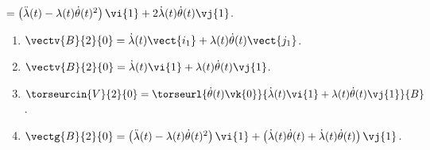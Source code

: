 $ = \left( \ddot{\lambda}(t)-\lambda(t)\dot{\theta}(t)^2\right)\vi{1}  +  2 \dot{\lambda}(t)\dot{\theta}(t) \vj{1}$.
\else
\fi

\ifcolle
\else
\begin{solution}
\begin{enumerate}
\item $\vectv{B}{2}{0} =\dot{\lambda}(t)\vect{i_1}+\lambda(t)\dot{\theta}(t)\vect{j_1}$.
\item $\vectv{B}{2}{0}=\dot{\lambda}(t)\vi{1}+\lambda(t)\dot{\theta}(t)\vj{1}$.
\item $\torseurcin{V}{2}{0} =\torseurl{\dot{\theta}(t)\vk{0}}{\dot{\lambda}(t)\vi{1}+\lambda(t)\dot{\theta}(t)\vj{1}}{B}$.
\item $\vectg{B}{2}{0} =  \left( \ddot{\lambda}(t)-\lambda(t)\dot{\theta}(t)^2\right)\vi{1}  +  \left( \dot{\lambda}(t)\dot{\theta}(t) +\dot{\lambda}(t)\dot{\theta}(t)\right) \vj{1}$.
\end{enumerate}
\end{solution}%
\fi
